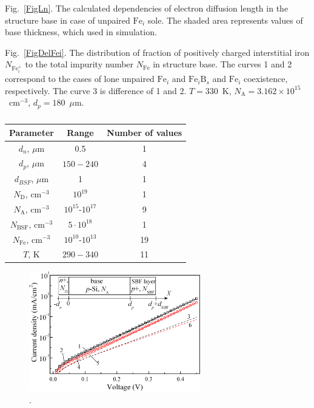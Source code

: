 \documentclass[12pt]{article}
\begin{document}
 Fig.~\ref{FigLn}.
The calculated dependencies of electron diffusion length in the structure base
in case of unpaired $\mathrm{Fe}_i$ sole.
The shaded area represents values of base thickness, which used in simulation.

 Fig.~\ref{FigDelFei}.
The distribution of fraction of positively charged interstitial iron $N_{\mathrm{Fe}_i^+}$ to the total
impurity number $N_{\mathrm{Fe}}$ in structure base.
The curves 1 and 2 correspond to the cases of lone unpaired $\mathrm{Fe}_i$ and $\mathrm{Fe}_i\mathrm{B}_s$ and $\mathrm{Fe}_i$ coexistence,
respectively.
The curve 3 is difference of 1 and 2.
$T=330$~K, $N_\mathrm{A}=3.162\times10^{15}$~cm$^{-3}$, $d_p=180$~$\mu$m.



\newpage

\begin{table}
\caption{\label{tabParametr}
}
\begin{tabular}{|c|c|c|}
\hline
Parameter& Range& Number of values\\
\hline
$d_n$, $\mu$m&0.5&1\\
\hline
$d_p$, $\mu$m&$150-240$&4\\
\hline
$d_{BSF}$, $\mu$m&1&1\\
\hline
$N_\mathrm{D}$, cm$^{-3}$&$10^{19}$&1\\
\hline
$N_\mathrm{A}$, cm$^{-3}$&$10^{15}$-$10^{17}$&9\\
\hline
$N_\mathrm{BSF}$, cm$^{-3}$&$5\cdot10^{18}$&1\\
\hline
$N_\mathrm{Fe}$, cm$^{-3}$&$10^{10}$-$10^{13}$&19\\
\hline
$T$, K&$290-340$&11\\
\hline
\end{tabular}
\end{table}

\begin{figure}
\includegraphics[width=7.5cm]{FigIV}
\caption{.
}
\label{FigIV}
\end{figure}
\end{document}
